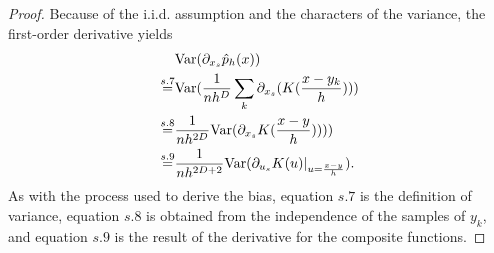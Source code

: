 \documentclass[aos,preprint]{imsart}
\theoremstyle{remark}
\begin{document}
\begin{appendix}
\begin{proof}
Because of the i.i.d. assumption and the characters of the variance, the first-order derivative yields
\[
\begin{aligned}
 &{\rm Var} (\partial_{x_s} \hat{p}_h(x))  \\
 \overset{s.7}{=} &{\rm Var} (\frac{1}{n h^D}\sum_k \partial_{x_s}(K(\frac{x-y_k}{h})))\\
 \overset{s.8} = &\frac{1}{n h^{2D}} {\rm Var}(  \partial_{x_s} K(\frac{x-y}{h}))))\\
 \overset{s.9} = & \frac{1}{n h^{2D+2}} {\rm Var} (\partial_ {u_s}  K(u)|_{u=\frac{x-y}{h}}).%
\end{aligned}
\]
As with the process used to derive the bias, equation $s.7$ is the definition of variance, equation $s.8$ is obtained from the independence of the samples of $y_k$, and equation $s.9$ is the result  of the derivative for the composite functions.


\end{proof}
\end{appendix}
\end{document}
